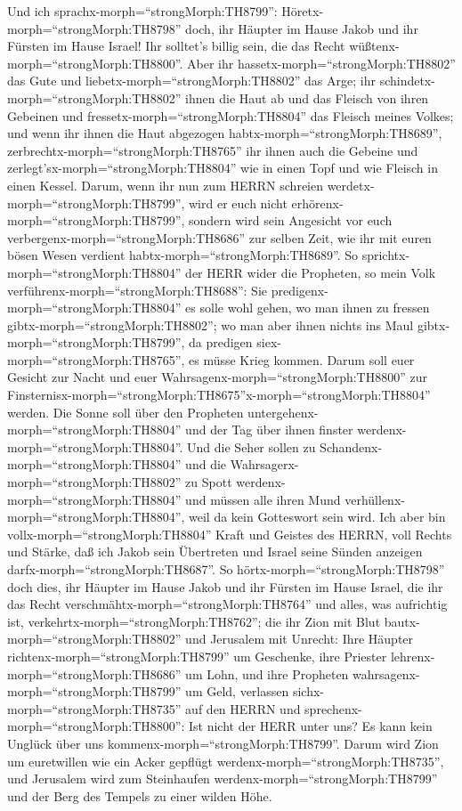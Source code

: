  Und ich sprachx-morph=``strongMorph:TH8799'':
Höretx-morph=``strongMorph:TH8798'' doch, ihr Häupter im Hause Jakob und
ihr Fürsten im Hause Israel! Ihr solltet's billig sein, die das Recht
wüßtenx-morph=``strongMorph:TH8800''.  Aber ihr
hassetx-morph=``strongMorph:TH8802'' das Gute und
liebetx-morph=``strongMorph:TH8802'' das Arge; ihr
schindetx-morph=``strongMorph:TH8802'' ihnen die Haut ab und das Fleisch
von ihren Gebeinen  und
fressetx-morph=``strongMorph:TH8804'' das Fleisch meines Volkes; und
wenn ihr ihnen die Haut abgezogen habtx-morph=``strongMorph:TH8689'',
zerbrechtx-morph=``strongMorph:TH8765'' ihr ihnen auch die Gebeine und
zerlegt'sx-morph=``strongMorph:TH8804'' wie in einen Topf und wie
Fleisch in einen Kessel.  Darum, wenn ihr nun zum HERRN
schreien werdetx-morph=``strongMorph:TH8799'', wird er euch nicht
erhörenx-morph=``strongMorph:TH8799'', sondern wird sein Angesicht vor
euch verbergenx-morph=``strongMorph:TH8686'' zur selben Zeit, wie ihr
mit euren bösen Wesen verdient habtx-morph=``strongMorph:TH8689''.
 So sprichtx-morph=``strongMorph:TH8804'' der HERR wider die
Propheten, so mein Volk verführenx-morph=``strongMorph:TH8688'': Sie
predigenx-morph=``strongMorph:TH8804'' es solle wohl gehen, wo man ihnen
zu fressen gibtx-morph=``strongMorph:TH8802''; wo man aber ihnen nichts
ins Maul gibtx-morph=``strongMorph:TH8799'', da predigen
siex-morph=``strongMorph:TH8765'', es müsse Krieg kommen. 
Darum soll euer Gesicht zur Nacht und euer
Wahrsagenx-morph=``strongMorph:TH8800'' zur
Finsternisx-morph=``strongMorph:TH8675''x-morph=``strongMorph:TH8804''
werden. Die Sonne soll über den Propheten
untergehenx-morph=``strongMorph:TH8804'' und der Tag über ihnen finster
werdenx-morph=``strongMorph:TH8804''.  Und die Seher sollen
zu Schandenx-morph=``strongMorph:TH8804'' und die
Wahrsagerx-morph=``strongMorph:TH8802'' zu Spott
werdenx-morph=``strongMorph:TH8804'' und müssen alle ihren Mund
verhüllenx-morph=``strongMorph:TH8804'', weil da kein Gotteswort sein
wird.  Ich aber bin vollx-morph=``strongMorph:TH8804'' Kraft
und Geistes des HERRN, voll Rechts und Stärke, daß ich Jakob sein
Übertreten und Israel seine Sünden anzeigen
darfx-morph=``strongMorph:TH8687''.  So
hörtx-morph=``strongMorph:TH8798'' doch dies, ihr Häupter im Hause Jakob
und ihr Fürsten im Hause Israel, die ihr das Recht
verschmähtx-morph=``strongMorph:TH8764'' und alles, was aufrichtig ist,
verkehrtx-morph=``strongMorph:TH8762'';  die ihr Zion mit
Blut bautx-morph=``strongMorph:TH8802'' und Jerusalem mit Unrecht:
 Ihre Häupter richtenx-morph=``strongMorph:TH8799'' um
Geschenke, ihre Priester lehrenx-morph=``strongMorph:TH8686'' um Lohn,
und ihre Propheten wahrsagenx-morph=``strongMorph:TH8799'' um Geld,
verlassen sichx-morph=``strongMorph:TH8735'' auf den HERRN und
sprechenx-morph=``strongMorph:TH8800'': Ist nicht der HERR unter uns? Es
kann kein Unglück über uns kommenx-morph=``strongMorph:TH8799''.
 Darum wird Zion um euretwillen wie ein Acker gepflügt
werdenx-morph=``strongMorph:TH8735'', und Jerusalem wird zum Steinhaufen
werdenx-morph=``strongMorph:TH8799'' und der Berg des Tempels zu einer
wilden Höhe.

